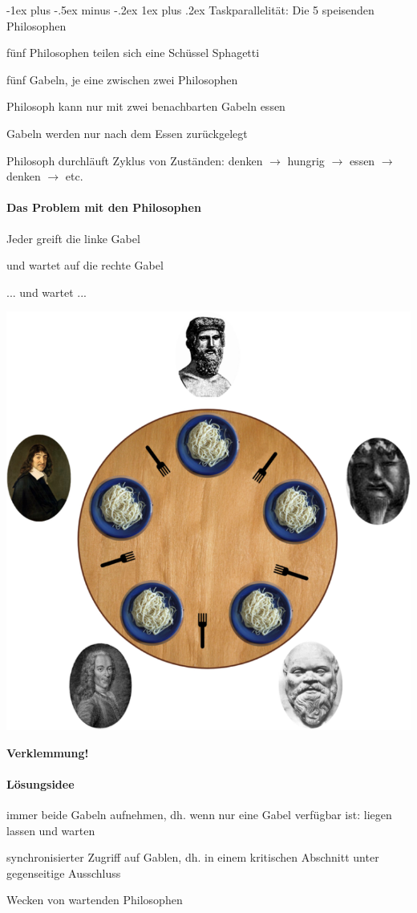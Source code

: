 \documentclass[10pt]{article}
\makeatletter
\renewcommand{\subsubsection}{\@startsection{subsubsection}{3}{0mm}%
                                {-1ex plus -.5ex minus -.2ex}%
                                {1ex plus .2ex}%
                                {\normalfont\small\bfseries}}
\makeatother
\begin{document}
\subsubsection{Taskparallelität: Die 5 speisenden Philosophen}
\begin{itemize*}
  \item fünf Philosophen teilen sich eine Schüssel Sphagetti
  \item fünf Gabeln, je eine zwischen zwei Philosophen
  \item Philosoph kann nur mit zwei benachbarten Gabeln essen
  \item Gabeln werden nur nach dem Essen zurückgelegt
  \item Philosoph durchläuft Zyklus von Zuständen: denken $\rightarrow$ hungrig $\rightarrow$ essen $\rightarrow$ denken $\rightarrow$ etc.
\end{itemize*}

\paragraph{Das Problem mit den Philosophen}

\begin{itemize*}
  \item Jeder greift die linke Gabel
  \item und wartet auf die rechte Gabel
  \item ... und wartet ...
\end{itemize*}
\begin{center}
  \includegraphics[width=0.3\linewidth]{Assets/Programmierparadigmen-philosophen}
\end{center}
\color{orange} \textbf{Verklemmung!} \color{black}

\paragraph{Lösungsidee}

\begin{itemize*}
  \item immer beide Gabeln aufnehmen, dh. wenn nur eine Gabel verfügbar ist: liegen lassen und warten
  \item synchronisierter Zugriff auf Gablen, dh. in einem kritischen Abschnitt unter gegenseitige Ausschluss
  \item Wecken von wartenden Philosophen
\end{itemize*}
\end{document}
